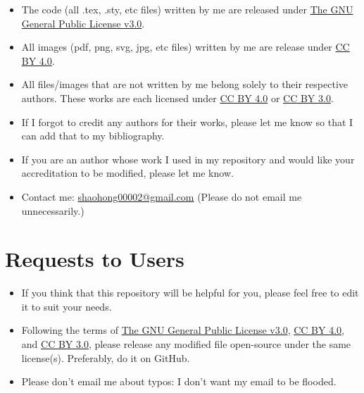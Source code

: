 \begin{itemize}
    \item The code (all .tex, .sty, etc files) written by me are released under \href{https://github.com/GrassGlass/A-Levels/blob/main/LICENSE}{The GNU General Public License v3.0}.
    \item All images (pdf, png, svg, jpg, etc files) written by me are release under \href{https://creativecommons.org/licenses/by/4.0/}{CC BY 4.0}.
    \item All files/images that are not written by me belong solely to their respective authors. These works are each licensed under \href{https://creativecommons.org/licenses/by/4.0/}{CC BY 4.0} or \href{https://creativecommons.org/licenses/by/3.0/}{CC BY 3.0}.
    \item If I forgot to credit any authors for their works, please let me know so that I can add that to my bibliography.
    \item If you are an author whose work I used in my repository and would like your accreditation to be modified, please let me know.
    \item Contact me: \href{mailto:shaohong00002@gmail.com}{shaohong00002@gmail.com} (Please do not email me unnecessarily.)
\end{itemize}
\section*{Requests to Users}
\begin{itemize}
    \item If you think that this repository will be helpful for you, please feel free to edit it to suit your needs.
    \item Following the terms of \href{https://github.com/GrassGlass/A-Levels/blob/main/LICENSE}{The GNU General Public License v3.0}, \href{https://creativecommons.org/licenses/by/4.0/}{CC BY 4.0}, and \href{https://creativecommons.org/licenses/by/3.0/}{CC BY 3.0}, please release any modified file open-source under the same license(s). Preferably, do it on GitHub.
    \item Please don't email me about typos: I don't want my email to be flooded.
\end{itemize}